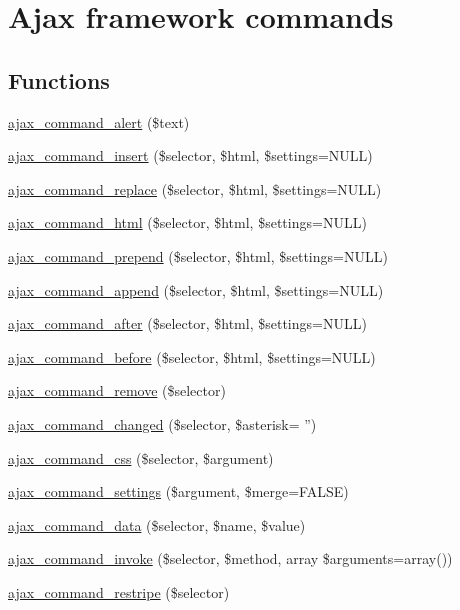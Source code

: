 \hypertarget{group__ajax__commands}{
\section{Ajax framework commands}
\label{group__ajax__commands}
}
\subsection*{Functions}
\begin{DoxyCompactItemize}
\item 
\hyperlink{group__ajax__commands_gae4fdd3ece45cf6469c7492f16219b337}{ajax\_\-command\_\-alert} (\$text)
\item 
\hyperlink{group__ajax__commands_ga6c3bb9fd1958e286e6e1330c182952a1}{ajax\_\-command\_\-insert} (\$selector, \$html, \$settings=NULL)
\item 
\hyperlink{group__ajax__commands_ga558989ae457ca293bfb8ea19070ed334}{ajax\_\-command\_\-replace} (\$selector, \$html, \$settings=NULL)
\item 
\hyperlink{group__ajax__commands_ga37b14987e96029b64247d750a5d4ed79}{ajax\_\-command\_\-html} (\$selector, \$html, \$settings=NULL)
\item 
\hyperlink{group__ajax__commands_gaafaae3874d173618f88c0baa1fdab12b}{ajax\_\-command\_\-prepend} (\$selector, \$html, \$settings=NULL)
\item 
\hyperlink{group__ajax__commands_ga861a6cb3b7347211edce388a2b446f91}{ajax\_\-command\_\-append} (\$selector, \$html, \$settings=NULL)
\item 
\hyperlink{group__ajax__commands_ga530d78ba7ea73497567e401a42fbbf94}{ajax\_\-command\_\-after} (\$selector, \$html, \$settings=NULL)
\item 
\hyperlink{group__ajax__commands_gafb261431270ce894d69e58a051ee9ead}{ajax\_\-command\_\-before} (\$selector, \$html, \$settings=NULL)
\item 
\hyperlink{group__ajax__commands_gadd65f6f231cc96812c810c54e36d9011}{ajax\_\-command\_\-remove} (\$selector)
\item 
\hyperlink{group__ajax__commands_ga64ba8a2e560b17e4fc8ca090a37314a0}{ajax\_\-command\_\-changed} (\$selector, \$asterisk= '')
\item 
\hyperlink{group__ajax__commands_gafb1f836e8545dad1a4a391e21404fb86}{ajax\_\-command\_\-css} (\$selector, \$argument)
\item 
\hyperlink{group__ajax__commands_ga3e41169f97184258a213d512cef81131}{ajax\_\-command\_\-settings} (\$argument, \$merge=FALSE)
\item 
\hyperlink{group__ajax__commands_gad092aa7cd3258f6ed7f18f9f2f8cb8db}{ajax\_\-command\_\-data} (\$selector, \$name, \$value)
\item 
\hyperlink{group__ajax__commands_gac49706a740d78d75f6a55bd2dba21c80}{ajax\_\-command\_\-invoke} (\$selector, \$method, array \$arguments=array())
\item 
\hyperlink{group__ajax__commands_ga59f78e53dfd51237ccedfaa0266b7f37}{ajax\_\-command\_\-restripe} (\$selector)
\end{DoxyCompactItemize}


